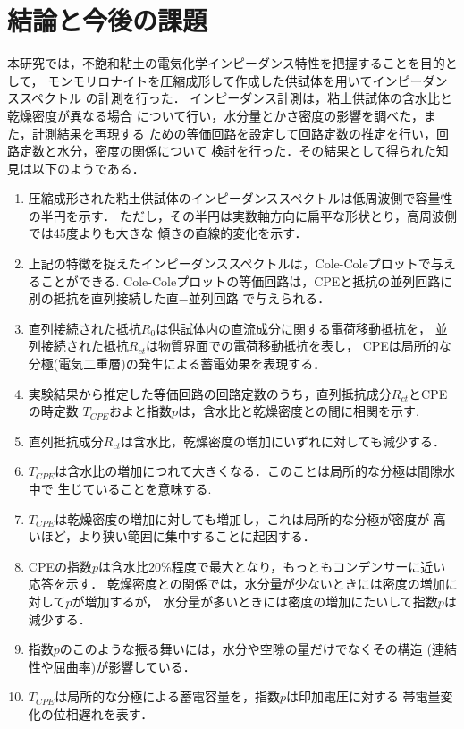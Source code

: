 ﻿\documentclass[11pt,a4j]{mybook2}
\begin{document}
\chapter{結論と今後の課題}
本研究では，不飽和粘土の電気化学インピーダンス特性を把握することを目的として，
モンモリロナイトを圧縮成形して作成した供試体を用いてインピーダンススペクトル
の計測を行った． インピーダンス計測は，粘土供試体の含水比と乾燥密度が異なる場合
について行い，水分量とかさ密度の影響を調べた，また，計測結果を再現する
ための等価回路を設定して回路定数の推定を行い，回路定数と水分，密度の関係について
検討を行った．その結果として得られた知見は以下のようである．
\begin{enumerate}
\item
        圧縮成形された粘土供試体のインピーダンススペクトルは低周波側で容量性の半円を示す．
        ただし，その半円は実数軸方向に扁平な形状とり，高周波側では45度よりも大きな
	傾きの直線的変化を示す．
\item
	上記の特徴を捉えたインピーダンススペクトルは，Cole-Coleプロットで与えることができる.
	Cole-Coleプロットの等価回路は，CPEと抵抗の並列回路に別の抵抗を直列接続した直−並列回路
	で与えられる．
\item
	直列接続された抵抗$R_{0}$は供試体内の直流成分に関する電荷移動抵抗を，
	並列接続された抵抗$R_{ct}$は物質界面での電荷移動抵抗を表し，
	CPEは局所的な分極(電気二重層)の発生による蓄電効果を表現する．
\item
	実験結果から推定した等価回路の回路定数のうち，直列抵抗成分$R_{ct}$とCPEの時定数
	$T_{CPE}$およと指数$p$は，含水比と乾燥密度との間に相関を示す.
\item
        直列抵抗成分$R_{ct}$は含水比，乾燥密度の増加にいずれに対しても減少する．
\item
        $T_{CPE}$は含水比の増加につれて大きくなる．このことは局所的な分極は間隙水中で
	生じていることを意味する.
\item
        $T_{CPE}$は乾燥密度の増加に対しても増加し，これは局所的な分極が密度が
	高いほど，より狭い範囲に集中することに起因する．
\item
        CPEの指数$p$は含水比$20\%$程度で最大となり，もっともコンデンサーに近い応答を示す．
        乾燥密度との関係では，水分量が少ないときには密度の増加に対して$p$が増加するが，
        水分量が多いときには密度の増加にたいして指数$p$は減少する．
\item
        指数$p$のこのような振る舞いには，水分や空隙の量だけでなくその構造
	(連結性や屈曲率)が影響している．
\item
        $T_{CPE}$は局所的な分極による蓄電容量を，指数$p$は印加電圧に対する
	帯電量変化の位相遅れを表す．
\end{enumerate}
\end{document}
